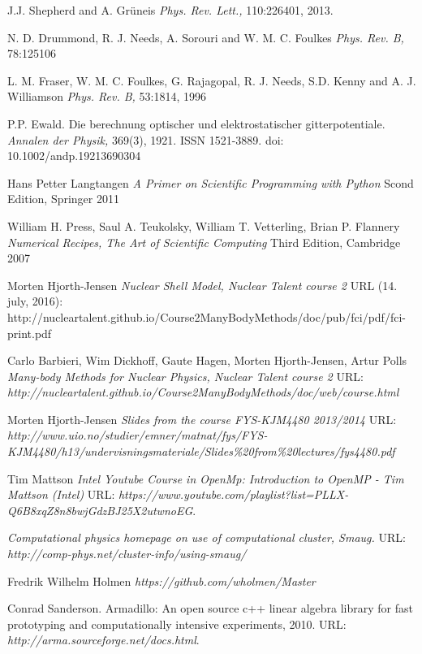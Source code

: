 \documentclass[twoside,english]{uiofysmaster}
\begin{document}
\begin{thebibliography}{9}
	J.J. Shepherd and A. Grüneis
	\textit{Phys. Rev. Lett.,} 110:226401, 2013.

	N. D. Drummond, R. J. Needs, A. Sorouri and W. M. C. Foulkes
	\textit{Phys. Rev. B,} 78:125106

	L. M. Fraser, W. M. C. Foulkes, G. Rajagopal, R. J. Needs, S.D. Kenny and A. J. Williamson
	\textit{Phys. Rev. B,} 53:1814, 1996

	P.P. Ewald. Die berechnung optischer und elektrostatischer gitterpotentiale. 
	\textit{Annalen der Physik,} 369(3), 1921. ISSN 1521-3889. doi: 10.1002/andp.19213690304

	Hans Petter Langtangen
	\textit{A Primer on Scientific Programming with Python} Scond Edition, Springer 2011

	William H. Press, Saul A. Teukolsky, William T. Vetterling, Brian P. Flannery
	\textit{Numerical Recipes, The Art of Scientific Computing} Third Edition, Cambridge 2007

	Morten Hjorth-Jensen
	\textit{Nuclear Shell Model, Nuclear Talent course 2} 
	URL (14. july, 2016): http://nucleartalent.github.io/Course2ManyBodyMethods/doc/pub/fci/pdf/fci-print.pdf

	Carlo Barbieri, Wim Dickhoff, Gaute Hagen, Morten Hjorth-Jensen, Artur Polls
	\textit{Many-body Methods for Nuclear Physics, Nuclear Talent course 2} 
	URL: \textit{http://nucleartalent.github.io/Course2ManyBodyMethods/doc/web/course.html}

	Morten Hjorth-Jensen
	\textit{Slides from the course FYS-KJM4480 2013/2014}
	URL: \textit{http://www.uio.no/studier/emner/matnat/fys/FYS-KJM4480/h13/undervisningsmateriale/Slides\%20from\%20lectures/fys4480.pdf}

	Tim Mattson
	\textit{Intel Youtube Course in OpenMp: Introduction to OpenMP - Tim Mattson (Intel)}
	URL: \textit{https://www.youtube.com/playlist?list=PLLX-Q6B8xqZ8n8bwjGdzBJ25X2utwnoEG}.

	\textit{Computational physics homepage on use of computational cluster, Smaug.}
	URL: \textit{http://comp-phys.net/cluster-info/using-smaug/}

	Fredrik Wilhelm Holmen
	\textit{https://github.com/wholmen/Master} 

	Conrad Sanderson. Armadillo: An open source c++ linear algebra library for fast prototyping and computationally intensive experiments, 2010.
	URL: \textit{http://arma.sourceforge.net/docs.html}.

\end{thebibliography}
\end{document}
